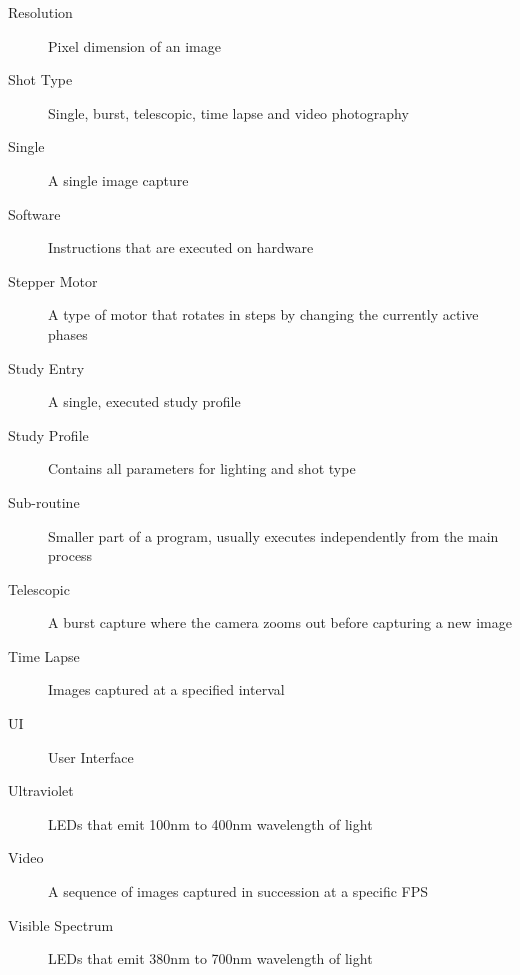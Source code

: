 \begin{description}
	\item[Resolution] Pixel dimension of an image
        \item[Shot Type] Single, burst, telescopic, time lapse and video photography
        \item[Single] A single image capture
        \item[Software] Instructions that are executed on hardware
        \item[Stepper Motor] A type of motor that rotates in steps by changing the currently active phases
        \item[Study Entry] A single, executed study profile
        \item[Study Profile] Contains all parameters for lighting and shot type
	\item[Sub-routine] Smaller part of a program, usually executes independently from the main process
        \item[Telescopic] A burst capture where the camera zooms out before capturing a new image
        \item[Time Lapse] Images captured at a specified interval
	\item[UI] User Interface
        \item[Ultraviolet] LEDs that emit 100nm to 400nm wavelength of light
        \item[Video] A sequence of images captured in succession at a specific FPS
        \item[Visible Spectrum] LEDs that emit 380nm to 700nm wavelength of light
\end{description}